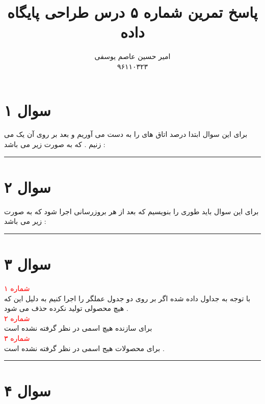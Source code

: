 \documentclass{article}
\title{پاسخ تمرین شماره ۵ درس طراحی پایگاه داده }
\author{امیر حسین عاصم یوسفی \\ ۹۶۱۱۰۳۲۳}
\begin{document}
	\maketitle
	\section*{سوال ۱}
	برای این سوال ابتدا درصد اتاق های 
را به دست می آوریم و بعد بر روی آن یک 
می زنیم  . که به صورت زیر می باشد : 

\begin{center}
\end{center}
\hrule
\section*{سوال ۲ }
برای این سوال باید طوری 
را بنویسیم که بعد از هر بروزرسانی اجرا شود که به صورت زیر می باشد : 
\begin{flushleft}
\end{flushleft}
\hrule
\section*{سوال ۳}
\textcolor{red}{شماره ۱ }
\\
با توجه به جداول داده شده اگر بر روی دو جدول عملگر 
را اجرا کنیم 
به دلیل این که هیچ محصولی تولید نکرده حذف می شود  . 
\\
\textcolor{red}{شماره ۲  }
\\
برای سازنده 
هیچ اسمی در نظر گرفته نشده است 
\\
\textcolor{red}{شماره ۳}
\\
برای محصولات 
هیج اسمی در نظر گرفته نشده است  . 
\hrule

\section*{سوال ۴ }
	
\end{document}

